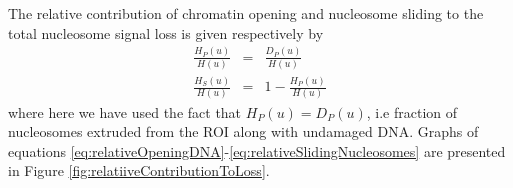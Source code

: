 \documentclass[12pt]{article}
\begin{document}
The relative contribution of chromatin opening and nucleosome
sliding to the total nucleosome signal loss is given respectively by
\begin{eqnarray}
\frac{H_P(u)}{H(u)} &=& \frac{D_P(u)}{H(u)}\label{eq:relativeOpeningNucleosomes}\\
\frac{H_S(u)}{H(u)} &=&1-\frac{H_P(u)}{H(u)} \label{eq:relativeSlidingNucleosomes}
\end{eqnarray}
where here we have used the fact that $H_P(u) = D_P(u)$, i.e fraction of nucleosomes extruded from the ROI along with undamaged DNA. Graphs of
equations \eqref{eq:relativeOpeningDNA}-\eqref{eq:relativeSlidingNucleosomes} are presented in Figure \ref{fig:relatiiveContributionToLoss}.


\end{document}
